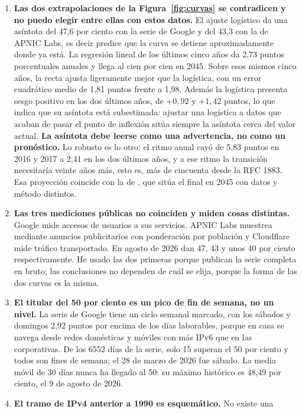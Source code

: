 \documentclass[11pt,letterpaper]{article}
\begin{document}
\begin{enumerate}
  \item \textbf{Las dos extrapolaciones de la Figura~\ref{fig:curvas} se
    contradicen y no puedo elegir entre ellas con estos datos.} El ajuste
    logístico da una asíntota del 47,6 por ciento con la serie de Google y del
    43,3 con la de APNIC Labs, es decir predice que la curva se detiene
    aproximadamente donde ya está. La regresión lineal de los últimos cinco años
    da 2,73 puntos porcentuales anuales y llega al cien por cien en 2045.
    Sobre esos mismos cinco años, la recta ajusta ligeramente mejor que la
    logística, con un error cuadrático medio de 1,81 puntos frente a 1,98. Además
    la logística presenta sesgo positivo en los dos últimos años, de $+0{,}92$ y
    $+1{,}42$ puntos, lo que indica que su asíntota está subestimada: ajustar una
    logística a datos que acaban de pasar el punto de inflexión sitúa siempre la
    asíntota cerca del valor actual. \textbf{La asíntota debe leerse como una
    advertencia, no como un pronóstico.} Lo robusto es lo otro: el ritmo anual
    cayó de 5,83 puntos en 2016 y 2017 a 2,41 en los dos últimos años, y a ese
    ritmo la transición necesitaría veinte años más, esto es, más de cincuenta
    desde la RFC 1883. Esa proyección coincide con la de \textcite{huston2024},
    que sitúa el final en 2045 con datos y método distintos.
  \item \textbf{Las tres mediciones públicas no coinciden y miden cosas
    distintas.} Google mide accesos de usuarios a sus servicios, APNIC Labs
    muestrea mediante anuncios publicitarios con ponderación por población y
    Cloudflare mide tráfico transportado. En agosto de 2026 dan 47, 43 y unos 40
    por ciento respectivamente. He usado las dos primeras porque publican la
    serie completa en bruto; las conclusiones no dependen de cuál se elija,
    porque la forma de las dos curvas es la misma.
  \item \textbf{El titular del 50 por ciento es un pico de fin de semana, no un
    nivel.} La serie de Google tiene un ciclo semanal marcado, con los sábados y
    domingos 2,92 puntos por encima de los días laborables, porque en casa se
    navega desde redes domésticas y móviles con más IPv6 que en las corporativas.
    De los \num{6552} días de la serie, solo 15 superan el 50 por ciento y todos
    son fines de semana; el 28 de marzo de 2026 fue sábado. La media móvil de 30
    días nunca ha llegado al 50: su máximo histórico es 48,49 por ciento, el 9 de
    agosto de 2026.
  \item \textbf{El tramo de IPv4 anterior a 1990 es esquemático.} No existe una

\end{enumerate}
\end{document}
